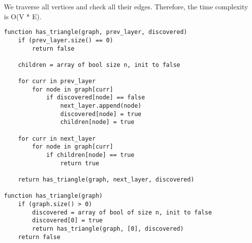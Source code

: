 \documentclass[11pt, oneside]{article}
\begin{document}
We traverse all vertices and check all their edges. Therefore, the time complexity is O(V * E).

\begin{lstlisting}
function has_triangle(graph, prev_layer, discovered)
    if (prev_layer.size() == 0)
        return false

    children = array of bool size n, init to false

    for curr in prev_layer
        for node in graph[curr]
            if discovered[node] == false
                next_layer.append(node)
                discovered[node] = true
                children[node] = true

    for curr in next_layer
        for node in graph[curr]
            if children[node] == true
                return true

    return has_triangle(graph, next_layer, discovered)

function has_triangle(graph)
    if (graph.size() > 0)
        discovered = array of bool of size n, init to false
        discovered[0] = true
        return has_triangle(graph, [0], discovered)
    return false
\end{lstlisting}

\clearpage
\end{document}
